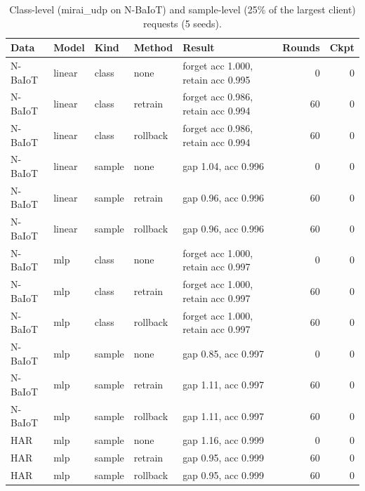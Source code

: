 \begin{table}[h]
\centering
\caption{Class-level (mirai\_udp on N-BaIoT) and sample-level (25\% of the largest client) requests (5 seeds).}\label{tab:s_gran}
\footnotesize
\setlength{\tabcolsep}{3pt}
\begin{tabular}{@{}lllllrr@{}}
\toprule
Data & Model & Kind & Method & Result & Rounds & Ckpt \\
\midrule
N-BaIoT & linear & class & none & forget acc 1.000, retain acc 0.995 & 0 & 0 \\
N-BaIoT & linear & class & retrain & forget acc 0.986, retain acc 0.994 & 60 & 0 \\
N-BaIoT & linear & class & rollback & forget acc 0.986, retain acc 0.994 & 60 & 0 \\
N-BaIoT & linear & sample & none & gap 1.04, acc 0.996 & 0 & 0 \\
N-BaIoT & linear & sample & retrain & gap 0.96, acc 0.996 & 60 & 0 \\
N-BaIoT & linear & sample & rollback & gap 0.96, acc 0.996 & 60 & 0 \\
N-BaIoT & mlp & class & none & forget acc 1.000, retain acc 0.997 & 0 & 0 \\
N-BaIoT & mlp & class & retrain & forget acc 1.000, retain acc 0.997 & 60 & 0 \\
N-BaIoT & mlp & class & rollback & forget acc 1.000, retain acc 0.997 & 60 & 0 \\
N-BaIoT & mlp & sample & none & gap 0.85, acc 0.997 & 0 & 0 \\
N-BaIoT & mlp & sample & retrain & gap 1.11, acc 0.997 & 60 & 0 \\
N-BaIoT & mlp & sample & rollback & gap 1.11, acc 0.997 & 60 & 0 \\
HAR & mlp & sample & none & gap 1.16, acc 0.999 & 0 & 0 \\
HAR & mlp & sample & retrain & gap 0.95, acc 0.999 & 60 & 0 \\
HAR & mlp & sample & rollback & gap 0.95, acc 0.999 & 60 & 0 \\
\bottomrule
\end{tabular}
\end{table}


